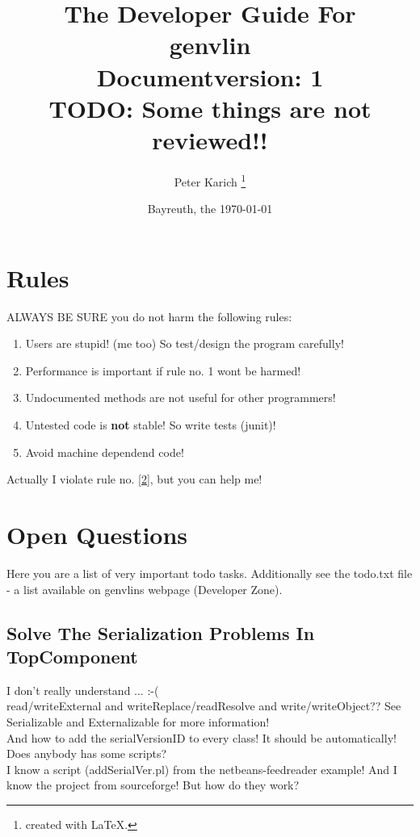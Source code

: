 \documentclass[12pt]{article}
\begin{document}
\addtocounter{footnote}{2}
\pagestyle{empty}
\title{ \bf \LARGE The Developer Guide For \\[1cm] genvlin\\[1cm] Documentversion: 1\\TODO: Some things are not reviewed!!}
\author{Peter Karich \footnote{created with \LaTeX{}.}}
\date{Bayreuth, the \today}
\maketitle
\newpage
\setcounter{tocdepth}{2}
\tableofcontents
\newpage
\pagestyle{headings}


\section{Rules}
ALWAYS BE SURE you do not harm the following rules:
\begin{enumerate}
\item Users are stupid! (me too) So test/design the program carefully!
\item \label{2} Performance is important if rule no. 1 wont be harmed!
\item Undocumented methods are not useful for other programmers!
\item Untested code is {\bf not} stable! So write tests (junit)!
\item Avoid machine dependend code!
\end{enumerate}
Actually I violate rule no. \ref{2}, but you can help me!
\section{Open Questions}
Here you are a list of very important todo tasks. Additionally see the todo.txt file - a list available on genvlins webpage (Developer Zone).
\subsection{Solve The Serialization Problems In TopComponent}
I don't really understand ... :-(\\
read/writeExternal and writeReplace/readResolve and write/writeObject?? See Serializable and Externalizable for more information!\\
And how to add the serialVersionID to every class! It should be automatically! Does anybody has some scripts?\\
I know a script (addSerialVer.pl) from the netbeans-feedreader example!
And I know the project from sourceforge! But how do they work?\\
\end{document}
